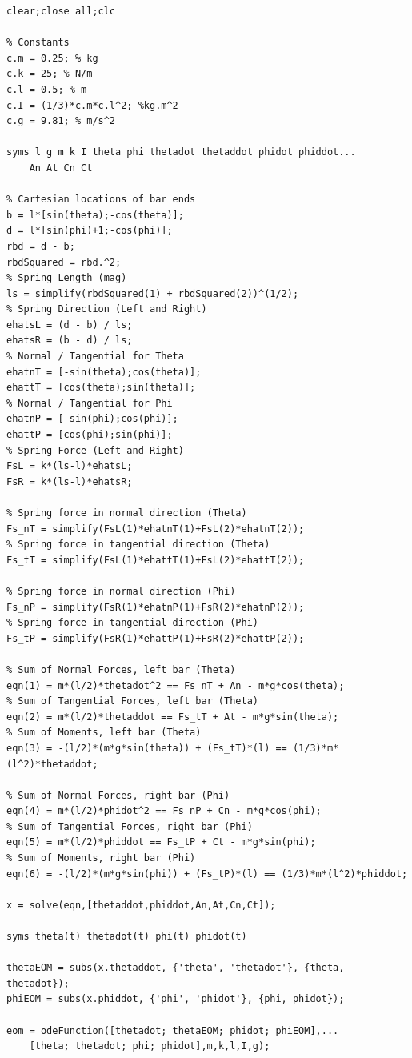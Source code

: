 \begin{lstlisting}[frame=lines,style=Matlab-editor]
clear;close all;clc

% Constants
c.m = 0.25; % kg
c.k = 25; % N/m
c.l = 0.5; % m
c.I = (1/3)*c.m*c.l^2; %kg.m^2
c.g = 9.81; % m/s^2

syms l g m k I theta phi thetadot thetaddot phidot phiddot...
    An At Cn Ct

% Cartesian locations of bar ends
b = l*[sin(theta);-cos(theta)];
d = l*[sin(phi)+1;-cos(phi)];
rbd = d - b;
rbdSquared = rbd.^2;
% Spring Length (mag)
ls = simplify(rbdSquared(1) + rbdSquared(2))^(1/2);
% Spring Direction (Left and Right)
ehatsL = (d - b) / ls;
ehatsR = (b - d) / ls;
% Normal / Tangential for Theta
ehatnT = [-sin(theta);cos(theta)];
ehattT = [cos(theta);sin(theta)];
% Normal / Tangential for Phi
ehatnP = [-sin(phi);cos(phi)];
ehattP = [cos(phi);sin(phi)];
% Spring Force (Left and Right)
FsL = k*(ls-l)*ehatsL;
FsR = k*(ls-l)*ehatsR;

% Spring force in normal direction (Theta)
Fs_nT = simplify(FsL(1)*ehatnT(1)+FsL(2)*ehatnT(2));
% Spring force in tangential direction (Theta)
Fs_tT = simplify(FsL(1)*ehattT(1)+FsL(2)*ehattT(2));

% Spring force in normal direction (Phi)
Fs_nP = simplify(FsR(1)*ehatnP(1)+FsR(2)*ehatnP(2));
% Spring force in tangential direction (Phi)
Fs_tP = simplify(FsR(1)*ehattP(1)+FsR(2)*ehattP(2));

% Sum of Normal Forces, left bar (Theta)
eqn(1) = m*(l/2)*thetadot^2 == Fs_nT + An - m*g*cos(theta);
% Sum of Tangential Forces, left bar (Theta)
eqn(2) = m*(l/2)*thetaddot == Fs_tT + At - m*g*sin(theta);
% Sum of Moments, left bar (Theta)
eqn(3) = -(l/2)*(m*g*sin(theta)) + (Fs_tT)*(l) == (1/3)*m*(l^2)*thetaddot;

% Sum of Normal Forces, right bar (Phi)
eqn(4) = m*(l/2)*phidot^2 == Fs_nP + Cn - m*g*cos(phi);
% Sum of Tangential Forces, right bar (Phi)
eqn(5) = m*(l/2)*phiddot == Fs_tP + Ct - m*g*sin(phi);
% Sum of Moments, right bar (Phi)
eqn(6) = -(l/2)*(m*g*sin(phi)) + (Fs_tP)*(l) == (1/3)*m*(l^2)*phiddot;

x = solve(eqn,[thetaddot,phiddot,An,At,Cn,Ct]);

syms theta(t) thetadot(t) phi(t) phidot(t)

thetaEOM = subs(x.thetaddot, {'theta', 'thetadot'}, {theta, thetadot});
phiEOM = subs(x.phiddot, {'phi', 'phidot'}, {phi, phidot});

eom = odeFunction([thetadot; thetaEOM; phidot; phiEOM],...
    [theta; thetadot; phi; phidot],m,k,l,I,g);


\end{lstlisting}
